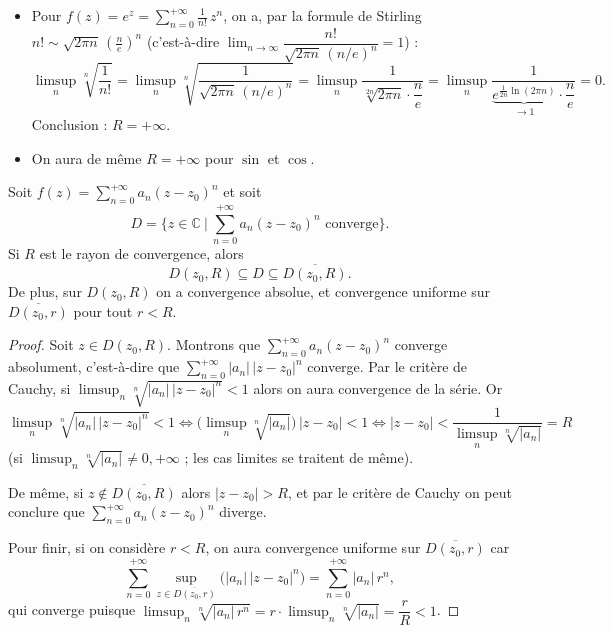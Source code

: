 \begin{exemple}
\begin{itemize}
  \item Pour $f(z) = e^z = \displaystyle\sum_{n=0}^{+\infty} \frac{1}{n!}\, z^n$, on a, par la formule de Stirling
  $n! \sim \sqrt{2\pi n}\,\left(\frac{n}{e}\right)^n$ (c'est-à-dire $\lim_{n\to\infty} \dfrac{n!}{\sqrt{2\pi n}\,(n/e)^n} = 1$) :
  \[
  \limsup_n \sqrt[n]{\frac{1}{n!}}
  = \limsup_n \sqrt[n]{\frac{1}{\sqrt{2\pi n}\,(n/e)^n}}
  = \limsup_n \frac{1}{\sqrt[2n]{2\pi n}\cdot \dfrac{n}{e}}
  = \limsup_n \frac{1}{\underbrace{e^{\frac{1}{2n}\ln(2\pi n)}}_{\to 1}\cdot \dfrac{n}{e}}
  = 0 .
  \]
  Conclusion : $R = +\infty$.
  \item On aura de même $R = +\infty$ pour $\sin$ et $\cos$.
\end{itemize}
\end{exemple}

\begin{proposition}\label{prop:disque}
Soit $f(z) = \displaystyle\sum_{n=0}^{+\infty} a_n (z-z_0)^n$ et soit
\[
D = \Big\{ z \in \mathbb{C} \ \Big|\ \sum_{n=0}^{+\infty} a_n (z-z_0)^n \text{ converge} \Big\}.
\]
Si $R$ est le rayon de convergence, alors
\[
D(z_0, R) \subseteq D \subseteq \overline{D(z_0, R)} .
\]
De plus, sur $D(z_0,R)$ on a convergence absolue, et convergence uniforme sur $\overline{D(z_0, r)}$ pour tout $r < R$.
\end{proposition}

\begin{proof}
Soit $z \in D(z_0, R)$. Montrons que $\sum_{n=0}^{+\infty} a_n (z-z_0)^n$ converge absolument, c'est-à-dire que
$\sum_{n=0}^{+\infty} |a_n|\,|z-z_0|^n$ converge.
Par le critère de Cauchy, si $\limsup_n \sqrt[n]{|a_n|\,|z-z_0|^n} < 1$ alors on aura convergence de la série. Or
\[
\limsup_n \sqrt[n]{|a_n|\,|z-z_0|^n} < 1
\iff \Big( \limsup_n \sqrt[n]{|a_n|} \Big)\,|z-z_0| < 1
\iff |z-z_0| < \frac{1}{\limsup_n \sqrt[n]{|a_n|}} = R
\]
(si $\limsup_n \sqrt[n]{|a_n|} \neq 0, +\infty$ ; les cas limites se traitent de même).

De même, si $z \notin \overline{D(z_0,R)}$ alors $|z-z_0| > R$, et par le critère de Cauchy on peut conclure que
$\sum_{n=0}^{+\infty} a_n (z-z_0)^n$ diverge.

Pour finir, si on considère $r < R$, on aura convergence uniforme sur $\overline{D(z_0,r)}$ car
\[
\sum_{n=0}^{+\infty} \sup_{z \in \overline{D(z_0,r)}} \big( |a_n|\,|z-z_0|^n \big) = \sum_{n=0}^{+\infty} |a_n|\, r^n ,
\]
qui converge puisque $\limsup_n \sqrt[n]{|a_n|\, r^n} = r \cdot \limsup_n \sqrt[n]{|a_n|} = \dfrac{r}{R} < 1$.
\end{proof}

